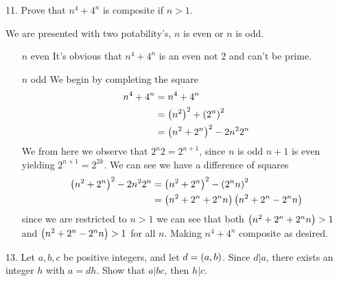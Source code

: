 \newpage
\begin{mdframed}[style=darkQuesion]
  11. Prove that $n^4+4^n$ is composite if $n>1$.
\end{mdframed}

\begin{mdframed}[style=darkAnswer,frametitle={Joe Starr}]
  We are presented with two potability's, $n$ is even or $n$ is odd.
  \begin{itemize}[align=left]
    \item [$n$ even]{\hspace{.5in}\newline
          It's obvious that $n^4+4^n$ is an even not $2$ and can't be prime.
          }
    \item [$n$ odd]{\hspace{.5in}\newline
          We begin by completing the square
          \begin{align*}
            n^4+4^n & = n^4+4^n                 \\
                    & =\left(n^2\right)^2+\left(2^n\right)^2  \\
                    & =\left(n^2+2^n\right)^2-2n^2 2^n
          \end{align*}
          We from here we observe that $2^n2=2^{n+1}$, since $n$ is odd $n+1$ is even
          yielding $2^{n+1}=2^{2k}$. We can see we have a difference of squares
          \begin{align*}
            \left(n^2+2^n\right)^2-2n^2 2^n & =\left(n^2+2^n\right)^2-\left(2^nn\right)^2         \\
                                     & =\left(n^2+2^n+2^nn\right)\left(n^2+2^n-2^nn\right)
          \end{align*}
          since we are restricted to $n>1$ we can see that both $\left(n^2+2^n+2^nn\right)>1$
          and $\left(n^2+2^n-2^nn\right)>1$ for all $n$. Making $n^4+4^n$ composite as
          desired.
          }
  \end{itemize}
\end{mdframed}
\newpage
\begin{mdframed}[style=darkQuesion]
  13. Let $a,b,c$  be positive integers, and let $d=\left(a,b\right)$. Since $d\vert a$,
  there exists an integer $h$ with $a=dh$. Show that $a\vert bc$, then $h\vert c$.
\end{mdframed}

